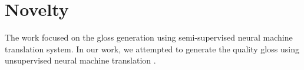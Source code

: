\section{Novelty} \label{sec: Novelty}
The work \cite{base_paper} focused on the gloss generation using semi-supervised neural machine translation system. In our work, we attempted to generate the quality gloss using unsupervised neural machine translation \cite{nmt}. 